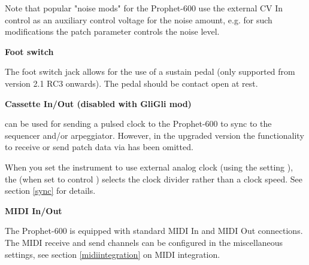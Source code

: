 Note that popular "noise mods" for the Prophet-600 use the external CV In control as an auxiliary control voltage for the noise amount, e.g. for such modifications the patch parameter controls the noise level.

\textbf{Foot switch}

The foot switch jack allows for the use of a sustain pedal (only supported from version 2.1 RC3 onwards). The pedal should be contact open at rest.

\textbf{Cassette In/Out (disabled with GliGli mod)}

\cassettein can be used for sending a pulsed clock to the Prophet-600 to sync to the sequencer and/or arpeggiator. However, in the upgraded version the functionality to receive or send patch data via \cassettein has been omitted. 

When you set the instrument to use external analog clock (using the setting \clocksync), the \datadial (when set to control \clock) selects the clock divider rather than a clock speed. See section \ref{sync} for details.

\textbf{MIDI In/Out}

The Prophet-600 is equipped with standard MIDI In and MIDI Out connections. The MIDI receive and send channels can be configured in the miscellaneous settings, see section \ref{midiintegration} on MIDI integration.  
